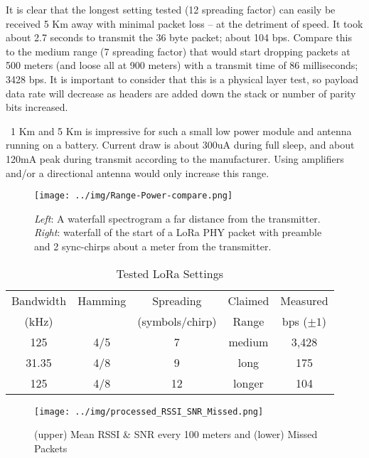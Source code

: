 \documentclass[conference, compsoc]{IEEEtran}
\begin{document}
It is clear that the longest setting tested (12 spreading factor) can easily be received 5 Km away with minimal packet loss -- at the detriment of speed. It took about 2.7 seconds to transmit the 36 byte packet; about 104 bps. Compare this to the medium range (7 spreading factor) that would start dropping packets at 500 meters (and loose all at 900 meters) with a transmit time of 86 milliseconds; 3428 bps. It is important to consider that this is a physical layer test, so payload data rate will decrease as headers are added down the stack or number of parity bits increased.

~1 Km and 5 Km is impressive for such a small low power module and antenna running on a  battery. Current draw is about 300uA during full sleep, and about 120mA peak during transmit according to the manufacturer\cite{ada-lora}. Using amplifiers and/or a directional antenna would only increase this range. 

\begin{figure}[htbp]
\begin{center}
\texttt{[image: ../img/Range-Power-compare.png]}
\caption{\textit{Left}: A waterfall spectrogram a far distance from the transmitter. \textit{Right}: waterfall of the start of a LoRa PHY packet with preamble and 2 sync-chirps about a meter from the transmitter.}
\label{fig:waterfall-compare}
\end{center}
\end{figure}

\begin{table*}[htp]
\normalsize
\caption{Tested LoRa Settings}
\begin{center}
\begin{tabular}{ c c c c c }
Bandwidth & Hamming & Spreading & Claimed & Measured \\
(kHz) &  & {\small(symbols/chirp)} & Range & bps ($\pm 1$) \\
\hline
125 & 4/5 & 7 & medium & 3,428 \\
31.35 & 4/8 & 9 & long & 175 \\
125 & 4/8 & 12 & longer & 104 \\
\end{tabular}
\end{center}
\label{tab:tested-settings}
\end{table*}%

\begin{figure*}[]
\begin{center}
\texttt{[image: ../img/processed\_RSSI\_SNR\_Missed.png]}
\caption{(upper) Mean RSSI \& SNR every 100 meters and (lower) Missed Packets}
\label{results-chart}
\end{center}
\end{figure*}
\end{document}
